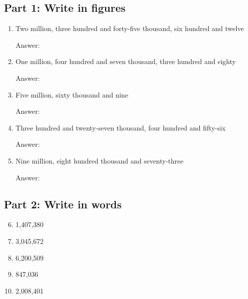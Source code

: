 \documentclass{article}
\begin{document}
\subsection*{Part 1: Write in figures}
\begin{enumerate}
    \item Two million, three hundred and forty-five thousand, six hundred and twelve
    
    Answer: \underline{\hspace{4cm}}
    
    \item One million, four hundred and seven thousand, three hundred and eighty
    
    Answer: \underline{\hspace{4cm}}
    
    \item Five million, sixty thousand and nine
    
    Answer: \underline{\hspace{4cm}}
    
    \item Three hundred and twenty-seven thousand, four hundred and fifty-six
    
    Answer: \underline{\hspace{4cm}}
    
    \item Nine million, eight hundred thousand and seventy-three
    
    Answer: \underline{\hspace{4cm}}
\end{enumerate}

\subsection*{Part 2: Write in words}
\begin{enumerate}
    \setcounter{enumi}{5}
    \item 1,407,380
    
    \vspace{1cm}
    
    \item 3,045,672
    
    \vspace{1cm}
    
    \item 6,200,509
    
    \vspace{1cm}
    
    \item 847,036
    
    \vspace{1cm}
    
    \item 2,008,401
    
    \vspace{1cm}
\end{enumerate}
\end{document}
